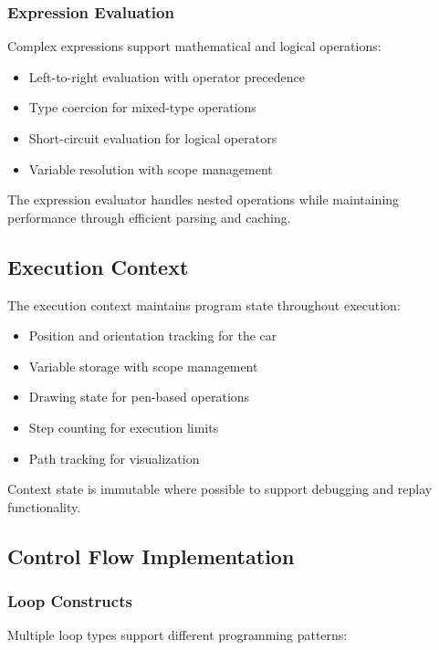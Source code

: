 \subsubsection{Expression Evaluation}

Complex expressions support mathematical and logical operations:

\begin{itemize}
    \item Left-to-right evaluation with operator precedence
    \item Type coercion for mixed-type operations
    \item Short-circuit evaluation for logical operators
    \item Variable resolution with scope management
\end{itemize}

The expression evaluator handles nested operations while maintaining performance through efficient parsing and caching.

\subsection{Execution Context}

The execution context maintains program state throughout execution:

\begin{itemize}
    \item Position and orientation tracking for the car
    \item Variable storage with scope management
    \item Drawing state for pen-based operations
    \item Step counting for execution limits
    \item Path tracking for visualization
\end{itemize}

Context state is immutable where possible to support debugging and replay functionality.

\subsection{Control Flow Implementation}

\subsubsection{Loop Constructs}

Multiple loop types support different programming patterns:

